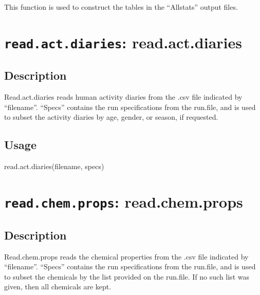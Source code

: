 \documentclass[
]{article}
\newenvironment{Shaded}{\begin{snugshade}}{\end{snugshade}}
\newcommand{\FunctionTok}[1]{\textcolor[rgb]{0.00,0.00,0.00}{#1}}
\newcommand{\NormalTok}[1]{#1}
\begin{document}
This function is used to construct the tables in the ``Allstats'' output
files.

\hypertarget{read.act.diaries-read.act.diaries}{%
\section{\texorpdfstring{\texttt{read.act.diaries}:
read.act.diaries}{read.act.diaries: read.act.diaries}}\label{read.act.diaries-read.act.diaries}}

\hypertarget{description-35}{%
\subsection{Description}\label{description-35}}

Read.act.diaries reads human activity diaries from the .csv file
indicated by ``filename''. ``Specs'' contains the run specifications
from the run.file, and is used to subset the activity diaries by age,
gender, or season, if requested.

\hypertarget{usage-35}{%
\subsection{Usage}\label{usage-35}}

\begin{Shaded}
\begin{Highlighting}[]
\FunctionTok{read.act.diaries}\NormalTok{(filename, specs)}
\end{Highlighting}
\end{Shaded}

\hypertarget{read.chem.props-read.chem.props}{%
\section{\texorpdfstring{\texttt{read.chem.props}:
read.chem.props}{read.chem.props: read.chem.props}}\label{read.chem.props-read.chem.props}}

\hypertarget{description-36}{%
\subsection{Description}\label{description-36}}

Read.chem.props reads the chemical properties from the .csv file
indicated by ``filename''. ``Specs'' contains the run specifications
from the run.file, and is used to subset the chemicals by the list
provided on the run.file. If no such list was given, then all chemicals
are kept.
\end{document}
